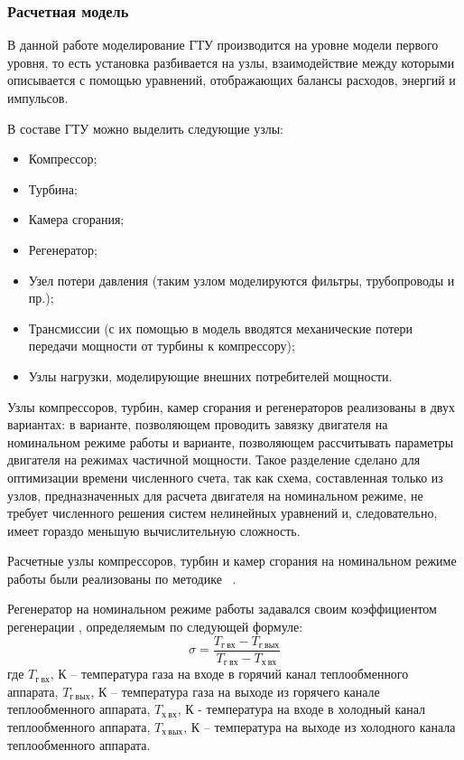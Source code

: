 \subsubsection{Расчетная модель}

В данной работе моделирование ГТУ производится на уровне модели первого уровня, то есть установка разбивается на узлы, взаимодействие между которыми описывается с помощью уравнений, отображающих балансы расходов, энергий и импульсов.

В составе ГТУ можно выделить следующие узлы:
\begin{itemize}
	\item Компрессор;
	\item Турбина;
	\item Камера сгорания;
	\item Регенератор;
	\item Узел потери давления (таким узлом моделируются фильтры, трубопроводы и пр.);
	\item Трансмиссии (с их помощью в модель вводятся механические потери передачи мощности от турбины к компрессору);
	\item Узлы нагрузки, моделирующие внешних потребителей мощности.
\end{itemize}

Узлы компрессоров, турбин, камер сгорания и регенераторов реализованы в двух вариантах: в варианте, позволяющем проводить завязку двигателя на номинальном режиме работы и варианте, позволяющем рассчитывать параметры двигателя на режимах частичной мощности. Такое разделение сделано для оптимизации времени численного счета, так как схема, составленная только из узлов, предназначенных для расчета двигателя на номинальном режиме, не требует численного решения систем нелинейных уравнений и, следовательно, имеет гораздо меньшую вычислительную сложность. 

Расчетные узлы компрессоров, турбин и камер сгорания на номинальном режиме работы были реализованы по методике ~\cite{cycle_methodics}.

Регенератор на номинальном режиме работы задавался своим коэффициентом регенерации , определяемым по следующей формуле:
$$
	\sigma = \frac{
		T_{г \ вх} - T_{г \ вых}
	}{
		T_{г \ вх} - T_{х \ вх}
	}
$$
где $T_{г \ вх}$, К – температура газа на входе в горячий канал теплообменного аппарата, $T_{г \ вых}$, К – температура газа на выходе из горячего канале теплообменного аппарата, $T_{х \ вх}$, К - температура на входе в холодный канал теплообменного аппарата, $T_{х \ вых}$, К – температура на выходе из холодного канала теплообменного аппарата.

